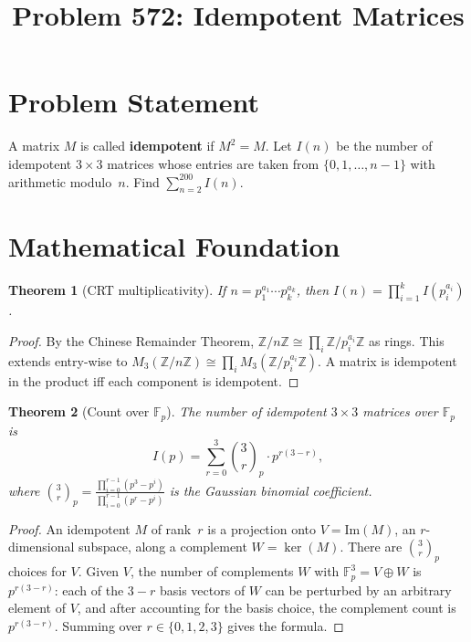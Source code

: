 \documentclass[12pt]{article}
\title{Problem 572: Idempotent Matrices}
\author{}
\date{}
\newtheorem{theorem}{Theorem}
\begin{document}
\maketitle

\section{Problem Statement}
A matrix $M$ is called \textbf{idempotent} if $M^2 = M$. Let $I(n)$ be the number of idempotent $3 \times 3$ matrices whose entries are taken from $\{0, 1, \ldots, n-1\}$ with arithmetic modulo~$n$. Find $\displaystyle\sum_{n=2}^{200} I(n)$.

\section{Mathematical Foundation}

\begin{theorem}[CRT multiplicativity]
If $n = p_1^{a_1} \cdots p_k^{a_k}$, then $I(n) = \prod_{i=1}^{k} I(p_i^{a_i})$.
\end{theorem}

\begin{proof}
By the Chinese Remainder Theorem, $\mathbb{Z}/n\mathbb{Z} \cong \prod_{i} \mathbb{Z}/p_i^{a_i}\mathbb{Z}$ as rings. This extends entry-wise to $M_3(\mathbb{Z}/n\mathbb{Z}) \cong \prod_{i} M_3(\mathbb{Z}/p_i^{a_i}\mathbb{Z})$. A matrix is idempotent in the product iff each component is idempotent.
\end{proof}

\begin{theorem}[Count over $\mathbb{F}_p$]
The number of idempotent $3 \times 3$ matrices over $\mathbb{F}_p$ is
\[
I(p) = \sum_{r=0}^{3} \binom{3}{r}_{\!p} \cdot p^{r(3-r)},
\]
where $\binom{3}{r}_p = \frac{\prod_{i=0}^{r-1}(p^3 - p^i)}{\prod_{i=0}^{r-1}(p^r - p^i)}$ is the Gaussian binomial coefficient.
\end{theorem}

\begin{proof}
An idempotent $M$ of rank~$r$ is a projection onto $V = \mathrm{Im}(M)$, an $r$-dimensional subspace, along a complement $W = \ker(M)$. There are $\binom{3}{r}_p$ choices for $V$. Given $V$, the number of complements $W$ with $\mathbb{F}_p^3 = V \oplus W$ is $p^{r(3-r)}$: each of the $3-r$ basis vectors of $W$ can be perturbed by an arbitrary element of $V$, and after accounting for the basis choice, the complement count is $p^{r(3-r)}$. Summing over $r \in \{0,1,2,3\}$ gives the formula.
\end{proof}
\end{document}
